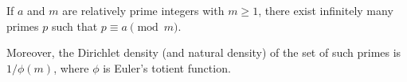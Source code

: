 If $a$ and $m$ are relatively prime integers with $m \geq 1$, there exist infinitely many primes $p$ such that $p \equiv a \pmod{m}$.

Moreover, the Dirichlet density (and natural density) of the set of such primes is $1/\phi(m)$, where $\phi$ is Euler's totient function.
